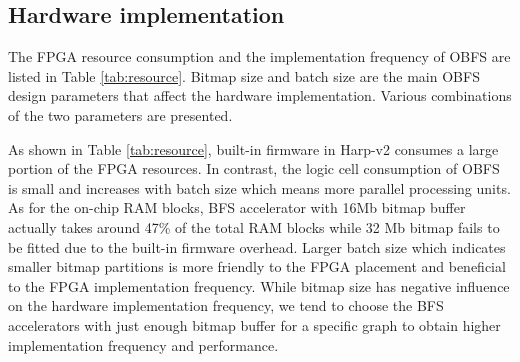 \subsection{Hardware implementation}
The FPGA resource consumption and the implementation frequency of 
OBFS are listed in Table \ref{tab:resource}. Bitmap size and batch 
size are the main OBFS design parameters that affect the hardware 
implementation. Various combinations of the two parameters are 
presented.

As shown in Table \ref{tab:resource}, built-in firmware in Harp-v2 consumes 
a large portion of the FPGA resources. In contrast, the logic cell 
consumption of OBFS is small and increases with batch size 
which means more parallel processing units. As for the on-chip 
RAM blocks, BFS accelerator with 16Mb bitmap buffer actually takes 
around 47\% of the total RAM blocks while 32 Mb bitmap fails to be fitted 
due to the built-in firmware overhead. Larger batch size which 
indicates smaller bitmap partitions is more friendly to 
the FPGA placement and beneficial to the FPGA 
implementation frequency. While bitmap size has 
negative influence on the hardware implementation frequency, 
we tend to choose the BFS accelerators with just enough 
bitmap buffer for a specific graph to obtain higher 
implementation frequency and performance.

